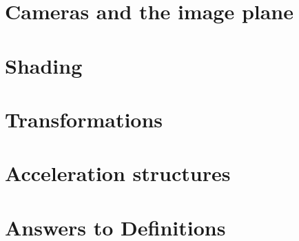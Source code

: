 \documentclass{article}
\begin{document}








\section{Cameras and the image plane}
\label{sec:cameras}


\section{Shading}
\label{sec:shading}


\section{Transformations}
\label{sec:transform}


\section{Acceleration structures}
\label{sec:accel}



\section{Answers to Definitions}





\end{document}
